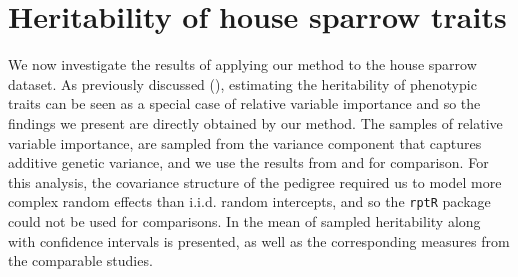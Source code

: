 \section{Heritability of house sparrow traits}
\label{sec:heritability_results}
We now investigate the results of applying our method to the house sparrow dataset. As previously discussed (), estimating the heritability of phenotypic traits can be seen as a special case of relative variable importance and so the findings we present are directly obtained by our method. The samples of relative variable importance, are sampled from the variance component that captures additive genetic variance, and we use the results from \citet{Silva2017} and \citet{Muff2019Genetic} for comparison. For this analysis, the covariance structure of the pedigree required us to model more complex random effects than i.i.d. random intercepts, and so the \texttt{rptR} package could not be used for comparisons. In  the mean of sampled heritability along with confidence intervals is presented, as well as the corresponding measures from the comparable studies.
